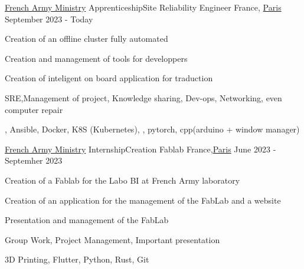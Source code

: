 

\begin{cventries}

	\cventry
	{\href{https://www.defense.gouv.fr/}{French Army Ministry}}
	{Apprenticeship{\enskip\cdotp\enskip}Site Reliability Engineer} %
	{France, \href{https://www.paris.fr/}{Paris}} %
	{September 2023 - Today} %
	{
		\begin{cvitems} %
			\item {Creation of an offline cluster fully automated}
			\item {Creation and management of tools for developpers}
			\item {Creation of inteligent on board application for traduction}
		\end{cvitems}
	}
	{
		\begin{cvitemsskills} %
			\item {SRE,Management of project, Knowledge sharing, Dev-ops, Networking, even computer repair}
			\item {\linux, Ansible, Docker, K8S (Kubernetes), \python, pytorch, cpp(arduino + window manager)}
		\end{cvitemsskills}
	}

	\cventry
	{\href{https://www.defense.gouv.fr/}{French Army Ministry}}
    {Internship{\enskip\cdotp\enskip}Creation Fablab} %
	{France,\href{https://www.paris.fr/}{Paris}} %
	{June 2023 - Septemher 2023} %
	{
		\begin{cvitems} %
			\item {Creation of a Fablab for the Labo BI at French Army laboratory}
			\item {Creation of an application for the management of the FabLab and a website}
			\item {Presentation and management of the FabLab}
		\end{cvitems}
	}
	{
		\begin{cvitemsskills} %
			\item {Group Work, Project Management, Important presentation}
			\item {3D Printing, Flutter, Python, Rust, Git }
		\end{cvitemsskills}
	}


\end{cventries}

